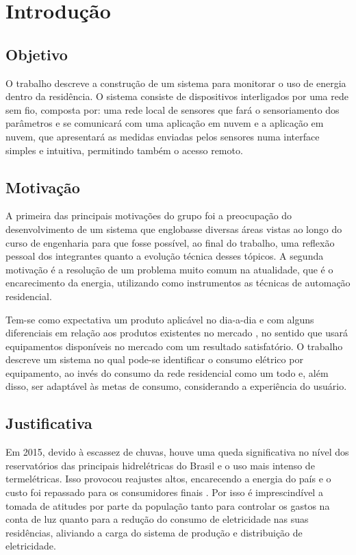 \chapter{Introdução}
\label{Cap:Introducao}

\section{Objetivo}
\label{Sec:objetivo}

O trabalho descreve a construção de um sistema para monitorar o uso de energia dentro da residência. O sistema consiste de dispositivos interligados por uma rede sem fio, composta por: uma rede local de sensores  que fará o sensoriamento dos parâmetros e se comunicará com uma aplicação em nuvem e a aplicação em nuvem, que apresentará as medidas enviadas pelos sensores numa interface simples e intuitiva, permitindo também o acesso remoto.

\section{Motivação}
\label{Sec:motivacao}

A primeira das principais motivações do grupo foi a preocupação do desenvolvimento de um sistema que englobasse diversas áreas vistas ao longo do curso de engenharia para que fosse possível, ao final do trabalho, uma reflexão pessoal dos integrantes quanto a evolução técnica desses tópicos. A segunda motivação é a resolução de um problema muito comum na atualidade, que é o encarecimento da energia,  utilizando como instrumentos as técnicas de automação residencial.

Tem-se como expectativa um produto aplicável no dia-a-dia e com alguns diferenciais em relação aos produtos existentes no mercado \cite{green_ant_site}, no sentido que usará equipamentos disponíveis no mercado com um resultado satisfatório. O trabalho descreve um sistema no qual pode-se identificar o consumo elétrico por equipamento, ao invés do consumo da rede residencial como um todo e, além disso, ser adaptável às metas de consumo, considerando a experiência do usuário.

\section{Justificativa}
\label{Sec:justificativa}

Em 2015, devido à escassez de chuvas, houve uma queda significativa no nível dos reservatórios das principais hidrelétricas do Brasil e o uso mais intenso de termelétricas. Isso provocou reajustes altos, encarecendo a energia do país e o custo foi repassado para os consumidores finais \cite{news_g1}  \cite{news_secretaria_de_energia}. Por isso é imprescindível a tomada de atitudes por parte da população tanto para controlar os gastos na conta de luz quanto para a redução do consumo de eletricidade nas suas residências,  aliviando a carga do sistema de produção e distribuição de eletricidade.


